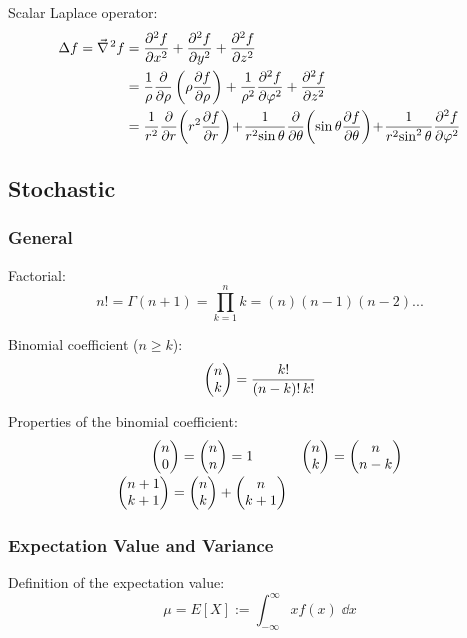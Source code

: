 			\noindent
			Scalar Laplace operator:
			\begin{equation}
				\begin{aligned}
					\Delta f = \Nabla^2 f &= \frac{\partial^2 f}{\partial x^2} + \frac{\partial^2 f}{\partial y^2} + \frac{\partial^2 f}{\partial z^2} \\
					&= \frac{1}{\rho} \frac{\partial}{\partial \rho}\left(\rho \frac{\partial f}{\partial \rho}\right)+ \frac{1}{\rho^2} \frac{\partial^2 f}{\partial \varphi^2}+ \frac{\partial^2 f}{\partial z^2} \\
					&= {\displaystyle \frac{1}{r^{2}} \frac{\partial }{\partial r}\!\left(r^{2}\frac{\partial f}{\partial r}\right)\!+\!\frac{1}{r^{2}\!\sin \theta } \frac{\partial }{\partial \theta }\!\left(\sin \theta \frac{\partial f}{\partial \theta }\right)\!+\!\frac{1}{r^{2}\!\sin ^{2}\theta }\frac{\partial ^{2}f}{\partial \varphi ^{2}}}
				\end{aligned}
			\end{equation}


	\subsection{Stochastic}
		\subsubsection{General}
			\noindent
			Factorial:
			\begin{equation}
				n!=\Gamma(n+1)=\prod_{k=1}^{n}k=(n)(n-1)(n-2)...
			\end{equation}

			\noindent
			Binomial coefficient ($n\ge k$):
			\begin{equation}
				\binomkoeff{n}{k} = \frac{k!}{\left(n-k\right)!\,k!}
			\end{equation}

			\noindent
			Properties of the binomial coefficient:
			\begin{equation}
				\begin{array}{cl}
					\binomkoeff{n}{0}=\binomkoeff{n}{n} = 1 & \binomkoeff{n}{k} = \binomkoeff{n}{n-k}\\ [8pt]
					\binomkoeff{n+1}{k+1}=\binomkoeff{n}{k}+\binomkoeff{n}{k+1}\\
				\end{array}
			\end{equation}

		\subsubsection{Expectation Value and Variance}
			\noindent
			Definition of the expectation value:
			\begin{equation}
				\mu = E\left[ X \right] := \int_{-\infty}^{\infty} xf(x)\;\dd x
			\end{equation}

